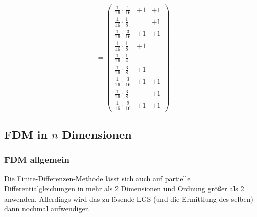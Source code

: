 \begin{frame}
$$=
\left(\begin{array}{lll} \frac{1}{16}\cdot \frac{1}{16}& +1&+1  \\ \frac{1}{16}\cdot \frac{1}{8} &&+1\\ \frac{1}{16}\cdot \frac{3}{16} &+1&+1\\\hline \frac{1}{16}\cdot \frac{1}{8} &+1&\\ \frac{1}{16}\cdot \frac{1}{4} &&\\ \frac{1}{16}\cdot \frac{3}{8} &+1&\\\hline \frac{1}{16}\cdot \frac{3}{16} &+1&+1  \\ \frac{1}{16}\cdot \frac{3}{8}&&+1 \\ \frac{1}{16}\cdot\frac{9}{16}&+1&+1 \end{array}\right)
$$

\end{frame}
%
\subsection{FDM in $n$ Dimensionen}
%
\begin{frame}\frametitle{FDM allgemein}
Die Finite-Differenzen-Methode lässt sich auch auf partielle Differentialgleichungen in mehr als 2 Dimensionen und Ordnung größer als 2 anwenden. Allerdings wird das zu lösende LGS (und die Ermittlung des selben) dann nochmal aufwendiger.

\end{frame}
%

